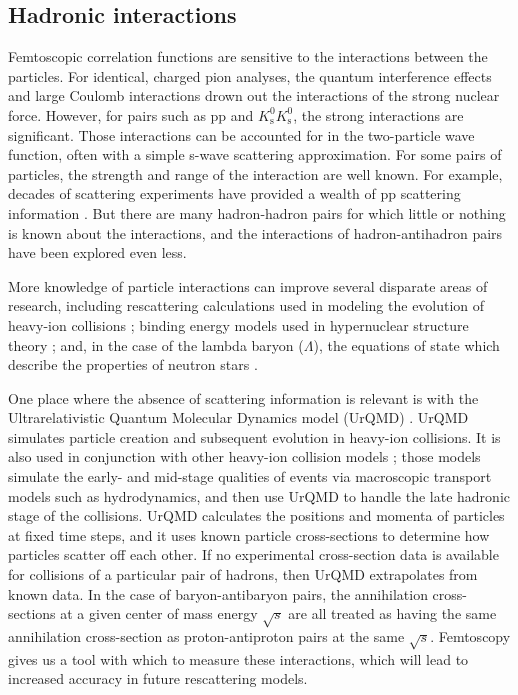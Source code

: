 \subsection{Hadronic interactions}
\label{sec:HadronicInteractions}



Femtoscopic correlation functions are sensitive to the interactions between the particles.
For identical, charged pion analyses, the quantum interference effects and large Coulomb interactions drown out the interactions of the strong nuclear force.
However, for pairs such as pp and $K^0_\mathrm{s}K^0_\mathrm{s}$, the strong interactions are significant.
Those interactions can be accounted for in the two-particle wave function, often with a simple s-wave scattering approximation.
For some pairs of particles, the strength and range of the interaction are well known. For example, decades of scattering experiments have provided a wealth of pp scattering information \cite{Perez:2013jpa}.
But there are many hadron-hadron pairs for which little or nothing is known about the interactions, and the interactions of hadron-antihadron pairs have been explored even less.


More knowledge of particle interactions can improve several disparate areas of research, including rescattering calculations used in modeling the evolution of heavy-ion collisions \cite{Bleicher:1999xi}; binding energy models used in hypernuclear structure theory \cite{Hiyama:2002yj,Filikhin:2002wm}; and, in the case of the lambda baryon ($\Lambda$), the equations of state which describe the properties of neutron stars \cite{SchaffnerBielich:2008kb,Wang:2010gr}.

One place where the absence of scattering information is relevant is with the Ultrarelativistic Quantum Molecular Dynamics model (UrQMD) \cite{Bleicher:1999xi}. UrQMD simulates particle creation and subsequent evolution in heavy-ion collisions.
It is also used in conjunction with other heavy-ion collision models \cite{Bass:2000ib,Ryu:2012at,Song:2013qma}; those models simulate the early- and mid-stage qualities of events via macroscopic transport models such as hydrodynamics, and then use UrQMD to handle the late hadronic stage of the collisions.
UrQMD calculates the positions and momenta of particles at fixed time steps, and it uses known particle cross-sections to determine how particles scatter off each other.
If no experimental cross-section data is available for collisions of a particular pair of hadrons, then UrQMD extrapolates from known data.
In the case of baryon-antibaryon pairs, the annihilation cross-sections at a given center of mass energy $\sqrt{s}$ are all treated as having the same annihilation cross-section as proton-antiproton pairs at the same $\sqrt{s}$.
Femtoscopy gives us a tool with which to measure these interactions, which will lead to increased accuracy in future rescattering models.


